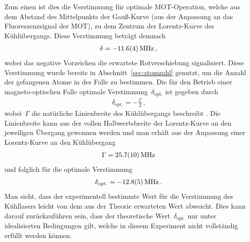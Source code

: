 \documentclass[11pt, a4paper]{article}
\numberwithin{equation}{section}
\begin{document}
Zum einen ist dies die Verstimmung für optimale MOT-Operation, welche aus dem Abstand des Mittelpunkts der Gauß-Kurve (aus der Anpassung an das Fluoreszenzsignal der MOT), zu dem Zentrum der Lorentz-Kurve des Kühlübergangs.
Diese Verstimmung beträgt demnach
\begin{align*}
	\delta = \SI{-11.6 +- 0.4}{MHz} \, \text{,}
\end{align*}
wobei das negative Vorzeichen die erwartete Rotverschiebung signalisiert.
Diese Verstimmung wurde bereits in Abschnitt~\ref{sec:atomzahl} genutzt, um die Anzahl der gefangenen Atome in der Falle zu bestimmen.
Die für den Betrieb einer magneto-optischen Falle optimale Verstimmung~$\delta_\mathrm{opt.}$ ist gegeben durch
\begin{align*}
	\delta_\mathrm{opt.} = -\frac{\Gamma}{2} \, \text{,}
\end{align*}
wobei~$\Gamma$ die natürliche Linienbreite des Kühlübergangs beschreibt \cite{foot}.
Die Linienbreite kann aus der vollen Halbwertsbreite der Lorentz-Kurve an den jeweiligen Übergang gewonnen werden und man erhält aus der Anpassung einer Lorentz-Kurve an den Kühlübergang
\begin{align*}
	\Gamma = \SI{25.7 +- 1.0}{MHz}
\end{align*}
und folglich für die optimale Verstimmung
\begin{align*}
	\delta_\mathrm{opt.} = \SI{-12.8 +- 0.5}{MHz} \, \text{.}
\end{align*}
Man sieht, dass der experimentell bestimmte Wert für die Verstimmung des Kühllasers leicht von dem aus der Theorie erwarteten Wert abweicht.
Dies kann darauf zurückzuführen sein, dass der theoretische Wert~$\delta_\mathrm{opt.}$ nur unter idealisierten Bedingungen gilt, welche in diesem Experiment nicht vollständig erfüllt werden können.
\end{document}
